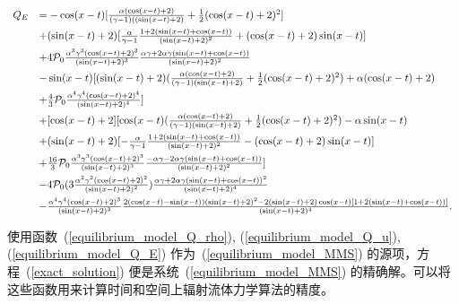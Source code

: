 \begin{equation}\label{equilibrium_model_Q_E}
\begin{array}{rl}
Q_E&=-\cos(x-t)[\frac{\alpha(\cos(x-t)+2)}{(\gamma-1)((\sin(x-t)+2)}+\frac{1}{2}(\cos(x-t)+2)^2]\vspace{1ex}\\
&+(\sin(x-t)+2)[\frac{\alpha}{\gamma-1}\frac{1+2(\sin(x-t)+\cos(x-t))}{(\sin(x-t)+2)^2}+(\cos(x-t)+2)\sin(x-t)]\vspace{1ex}\\
&+4\mathcal{P}_0\frac{\alpha^3\gamma^3(\cos(x-t)+2)^3}{(\sin(x-t)+2)^3}\frac{\alpha\gamma+2\alpha\gamma(\sin(x-t)+\cos(x-t))}{(\sin(x-t)+2)^2}\vspace{1ex}\\
&-\sin(x-t)[(\sin(x-t)+2)(\frac{\alpha(\cos(x-t)+2)}{(\gamma-1)(\sin(x-t)+2)}+\frac{1}{2}(\cos(x-t)+2)^2)+\alpha(\cos(x-t)+2)\vspace{1ex}\\
&+\frac{4}{3}\mathcal{P}_0\frac{\alpha^4\gamma^4(\cos(x-t)+2)^4}{(\sin(x-t)+2)^4}]\vspace{1ex}\\
&+[\cos(x-t)+2][\cos(x-t)(\frac{\alpha(\cos(x-t)+2)}{(\gamma-1)(\sin(x-t)+2)}+\frac{1}{2}(\cos(x-t)+2)^2)-\alpha \sin(x-t)\vspace{1ex}\\
&+(\sin(x-t)+2)[-\frac{\alpha}{\gamma-1}\frac{1+2(\sin(x-t)+\cos(x-t))}{(\sin(x-t)+2)^2}-(\cos(x-t)+2)\sin(x-t)]\vspace{1ex}\\
&+\frac{16}{3}\mathcal{P}_0\frac{\alpha^3\gamma^3(\cos(x-t)+2)^3}{(\sin(x-t)+2)^3}\frac{-\alpha\gamma-2\alpha\gamma(\sin(x-t)+\cos(x-t))}{(\sin(x-t)+2)^2}]\vspace{1ex}\\
&-4\mathcal{P}_0(3\frac{\alpha^2\gamma^2(\cos(x-t)+2)^2}{(\sin(x-t)+2)^2})\frac{\alpha\gamma+2\alpha\gamma(\sin(x-t)+\cos(x-t))^2}{(\sin(x-t)+2)^4}\vspace{1ex}\\
&-\frac{\alpha^4\gamma^4(\cos(x-t)+2)^3}{(\sin(x-t)+2)^3}\frac{2(\cos(x-t)-\sin(x-t))(\sin(x-t)+2)^2-2(\sin(x-t)+2)\cos(x-t)[1+2(\sin(x-t)+\cos(x-t))]}{(\sin(x-t)+2)^4}.\vspace{1ex}
\end{array}
\end{equation}
使用函数~(\ref{equilibrium_model_Q_rho}), (\ref{equilibrium_model_Q_u}), (\ref{equilibrium_model_Q_E}) 作为~(\ref{equilibrium_model_MMS}) 的源项，方程~(\ref{exact_solution}) 便是系统~(\ref{equilibrium_model_MMS}) 的精确解。可以将这些函数用来计算时间和空间上辐射流体力学算法的精度。
